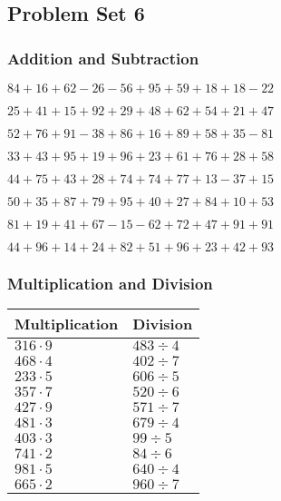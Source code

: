 \hypertarget{problem-set-6}{%
\subsection{Problem Set 6}\label{problem-set-6}}

\hypertarget{addition-and-subtraction}{%
\subsubsection{Addition and
Subtraction}\label{addition-and-subtraction}}

\(84+16+62-26-56+95+59+18+18-22\)

\(25+41+15+92+29+48+62+54+21+47\)

\(52+76+91-38+86+16+89+58+35-81\)

\(33+43+95+19+96+23+61+76+28+58\)

\(44+75+43+28+74+74+77+13-37+15\)

\(50+35+87+79+95+40+27+84+10+53\)

\(81+19+41+67-15-62+72+47+91+91\)

\(44+96+14+24+82+51+96+23+42+93\)

\hypertarget{multiplication-and-division}{%
\subsubsection{Multiplication and
Division}\label{multiplication-and-division}}

\begin{longtable}[]{@{}ll@{}}
\toprule
Multiplication & Division\tabularnewline
\midrule
\endhead
\(316\cdot9\) & \(483÷4\)\tabularnewline
\(468\cdot4\) & \(402÷7\)\tabularnewline
\(233\cdot5\) & \(606÷5\)\tabularnewline
\(357\cdot7\) & \(520÷6\)\tabularnewline
\(427\cdot9\) & \(571÷7\)\tabularnewline
\(481\cdot3\) & \(679÷4\)\tabularnewline
\(403\cdot3\) & \(99÷5\)\tabularnewline
\(741\cdot2\) & \(84 ÷6\)\tabularnewline
\(981\cdot5\) & \(640÷4\)\tabularnewline
\(665\cdot2\) & \(960÷7\)\tabularnewline
\bottomrule
\end{longtable}
